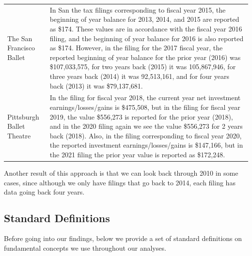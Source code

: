 \documentclass[Dance Data
Project,article,submit,moreauthors,pdftex]{mdpi}
\begin{document}
\begin{table}[!h]
\begin{tabular}[t]{l>{\raggedright\arraybackslash}p{35em}}
\addlinespace
The San Francisco Ballet & In San the tax filings corresponding to fiscal year 2015, the beginning of year balance for 2013, 2014, and 2015 are reported as \$174.  These values are in accordance with the fiscal year 2016 filing, and the beginning of year balance for 2016 is also reported as \$174.  However, in the filing for the 2017 fiscal year, the reported beginning of year balance for the prior year (2016) was \$107,033,575, for two years back (2015) it was  105,867,946, for three years back (2014) it was 92,513,161, and for four years back (2013) it was \$79,137,681.\\
\addlinespace
Pittsburgh Ballet Theatre & In the filing for fiscal year 2018, the current year net investment earnings/losses/gains is \$475,508, but in the filing for fiscal year 2019, the value \$556,273 is reported for the prior year (2018), and in the 2020 filing again we see the value \$556,273 for 2 years back (2018). Also, in the filing corresponding to fiscal year 2020, the reported investment earnings/losses/gains is \$147,166, but in the 2021 filing the prior year value is reported as \$172,248.\\
\bottomrule
\end{tabular}
\end{table}

Another result of this approach is that we can look back through 2010 in
some cases, since although we only have filings that go back to 2014,
each filing has data going back four years.

\hypertarget{standard-definitions}{%
\subsection{Standard Definitions}\label{standard-definitions}}

Before going into our findings, below we provide a set of standard
definitions on fundamental concepts we use throughout our analyses.
\end{document}
